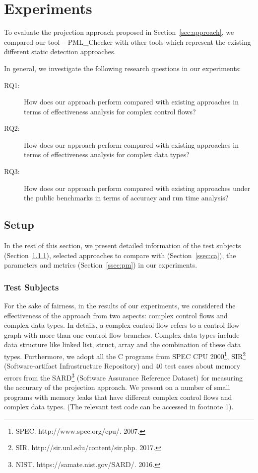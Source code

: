 \section{Experiments}\label{sec:experiments}

To evaluate the projection approach proposed in Section~\ref{sec:approach}, 
we compared our tool -- PML\_Checker with other tools which represent the existing different static detection approaches. 

In general, we investigate the following research questions in our experiments:
\begin{description}
\item[RQ1:] How does our approach perform compared with existing approaches in terms of effectiveness analysis for complex control flows? 
\item[RQ2:] How does our approach perform compared with existing approaches in terms of effectiveness analysis for complex data types? 
\item[RQ3:] How does our approach perform compared with existing approaches under the public benchmarks in terms of accuracy and run time analysis? 
\end{description}

\subsection{Setup}
In the rest of this section, we present detailed information of the test subjects (Section~\ref{ssec:ts}), selected approaches to compare with (Section~\ref{ssec:ca}), the parameters and metrics (Section~\ref{ssec:pm}) in our experiments.

\subsubsection{Test Subjects}\label{ssec:ts}
For the sake of fairness, in the results of our experiments, we considered the effectiveness of the approach from two aspects: complex control flows and complex data types. In details, a complex control flow refers to a control flow graph with more than one control flow branches. Complex data types include data structure like linked list, struct, array and the combination of these data types. Furthermore, we adopt all the C programs from SPEC CPU 2000\footnote{SPEC. http://www.spec.org/cpu/. 2007.}, SIR\footnote{SIR. http://sir.unl.edu/content/sir.php. 2017.} (Software-artifact Infrastructure Repository) and $40$ test cases about memory errors from the SARD\footnote{NIST. https://samate.nist.gov/SARD/. 2016.} (Software Assurance Reference Dataset) for measuring the accuracy of the projection approach. We present on a number of small programs with memory leaks that have different complex control flows and complex data types. (The relevant test code can be accessed in footnote 1).
